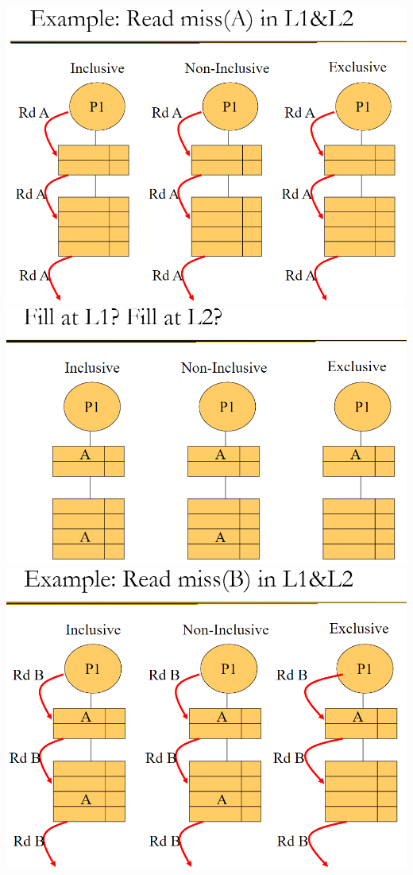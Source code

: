 \documentclass[12pt]{extarticle}
\begin{document}
	\begin{center}
		\includegraphics[scale=0.5]{assets/inclusion-policy-ex1.png}
		\includegraphics[scale=0.5]{assets/inclusion-policy-ex2.png}
		\includegraphics[scale=0.5]{assets/inclusion-policy-ex3.png}

\end{center}
\end{document}
